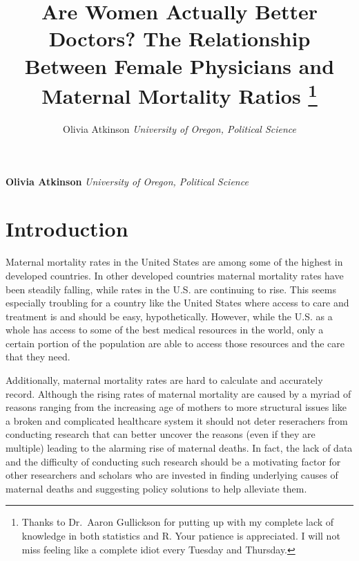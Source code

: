 \documentclass[11pt,]{article}
\title{Are Women Actually Better Doctors? The Relationship Between Female
Physicians and Maternal Mortality Ratios \thanks{Thanks to Dr.~Aaron Gullickson for putting up with my complete lack of
knowledge in both statistics and R. Your patience is appreciated. I will
not miss feeling like a complete idiot every Tuesday and Thursday.}  }
\author{\Large Olivia Atkinson\vspace{0.05in} \newline\normalsize\emph{University of Oregon, Political Science}  }
\date{}
\newcommand*{\authorfont}{\fontfamily{phv}\selectfont}
\begin{document}
	
%
\setcounter{page}{1}


{%
\setlength{\parindent}{0pt}
\thispagestyle{plain}
{\fontsize{18}{20}\selectfont\raggedright 
\maketitle  %

}

{
   \vskip 13.5pt\relax \normalsize\fontsize{11}{12} 
\textbf{\authorfont Olivia Atkinson} \hskip 15pt \emph{\small University of Oregon, Political Science}   

}

}





\vskip 6.5pt

\noindent  \section{Introduction}\label{introduction}

Maternal mortality rates in the United States are among some of the
highest in developed countries. In other developed countries maternal
mortality rates have been steadily falling, while rates in the U.S. are
continuing to rise. This seems especially troubling for a country like
the United States where access to care and treatment is and should be
easy, hypothetically. However, while the U.S. as a whole has access to
some of the best medical resources in the world, only a certain portion
of the population are able to access those resources and the care that
they need.

Additionally, maternal mortality rates are hard to calculate and
accurately record. Although the rising rates of maternal mortality are
caused by a myriad of reasons ranging from the increasing age of mothers
to more structural issues like a broken and complicated healthcare
system it should not deter reserachers from conducting research that can
better uncover the reasons (even if they are multiple) leading to the
alarming rise of maternal deaths. In fact, the lack of data and the
difficulty of conducting such research should be a motivating factor for
other researchers and scholars who are invested in finding underlying
causes of maternal deaths and suggesting policy solutions to help
alleviate them.
\end{document}
